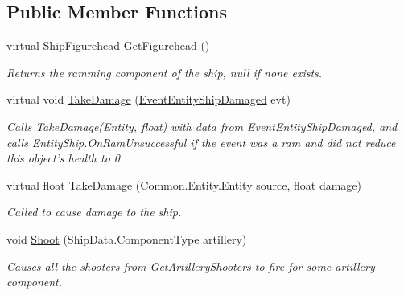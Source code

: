 \subsection*{Public Member Functions}
\begin{DoxyCompactItemize}
\item 
virtual \hyperlink{class_skyrates_1_1_client_1_1_ship_1_1_ship_figurehead}{Ship\-Figurehead} \hyperlink{class_skyrates_1_1_client_1_1_entity_1_1_entity_ship_a08f8bb2a31e9f5cdc7a381d8c56670e3}{Get\-Figurehead} ()
\begin{DoxyCompactList}\small\item\em Returns the ramming component of the ship, null if none exists. \end{DoxyCompactList}\item 
virtual void \hyperlink{class_skyrates_1_1_client_1_1_entity_1_1_entity_ship_a64d1b835a2e8911de33b19d7cd6948fd}{Take\-Damage} (\hyperlink{class_skyrates_1_1_client_1_1_game_1_1_event_1_1_event_entity_ship_damaged}{Event\-Entity\-Ship\-Damaged} evt)
\begin{DoxyCompactList}\small\item\em Calls Take\-Damage(\-Entity, float) with data from Event\-Entity\-Ship\-Damaged, and calls Entity\-Ship.\-On\-Ram\-Unsuccessful if the event was a ram and did not reduce this object's health to 0. \end{DoxyCompactList}\item 
virtual float \hyperlink{class_skyrates_1_1_client_1_1_entity_1_1_entity_ship_abad1336581d008dcdd90f400c91f6089}{Take\-Damage} (\hyperlink{class_skyrates_1_1_common_1_1_entity_1_1_entity}{Common.\-Entity.\-Entity} source, float damage)
\begin{DoxyCompactList}\small\item\em Called to cause damage to the ship. \end{DoxyCompactList}\item 
void \hyperlink{class_skyrates_1_1_client_1_1_entity_1_1_entity_ship_ad039d8b72251304fa50236d120bd6a46}{Shoot} (Ship\-Data.\-Component\-Type artillery)
\begin{DoxyCompactList}\small\item\em Causes all the shooters from \hyperlink{class_skyrates_1_1_client_1_1_entity_1_1_entity_ship_ae647437ac479d1758cf5ad5a80c4f89c}{Get\-Artillery\-Shooters} to fire for some artillery component. \end{DoxyCompactList}\end{DoxyCompactItemize}

